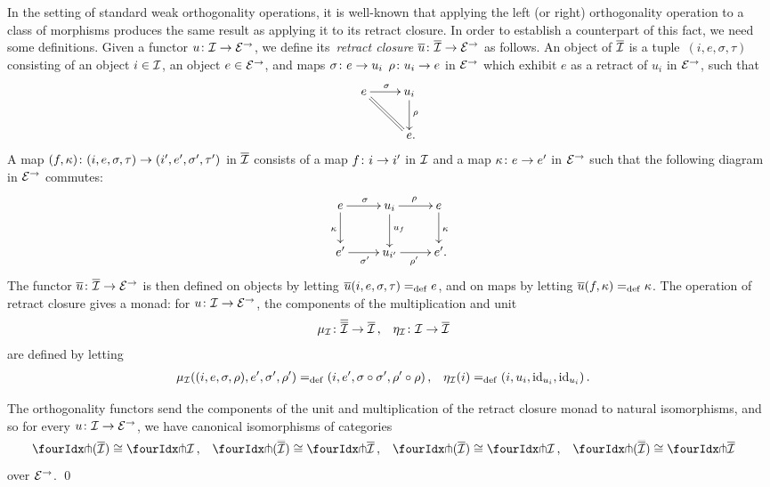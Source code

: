 \documentclass[reqno,10pt,a4paper,oneside,draft]{amsart}
\begin{document}
In the setting of standard weak orthogonality operations, it is well-known that applying the left (or right) orthogonality operation to a class of morphisms produces the same result as applying it to its retract closure.
In order to establish a counterpart of this fact, we need some definitions.
Given a functor $u \co \cal{I} \to \calE^\to$, we define its~\emph{retract closure} $\overline{u} \co \overline{\cal{I}} \to \catE^\to$ as follows.
An object of $\overline{\cal{I}}$ is a tuple~$(i, e, \sigma, \tau)$ consisting of an object $i \in \cal{I}$, an object $e \in \catE^\to$, and maps $\sigma \co e \rightarrow u_i$ $\rho \co u_i \rightarrow e$ in $\catE^\to$ which exhibit $e$ as a retract of $u_i$ in $\catE^\to$, \ie such that
\[
\xymatrix{
  e
  \ar[r]^{\sigma}
  \ar@{=}[dr]
&
  u_i
  \ar[d]^{\rho}
\\&
  e
\rlap{.}}
\]
A map $(f, \kappa) \co (i, e, \sigma, \tau) \to (i', e', \sigma', \tau')$ in $\overline{\cal{I}}$ consists of a map $f \co i \to i'$ in $\cal{I}$ and a map $\kappa \co e \rightarrow e'$ in $\catE^\to$ such that the following diagram in $\catE^\to$ commutes:
\[
\xymatrix{
  e
  \ar[r]^{\sigma}
  \ar[d]_{\kappa}
&
  u_i
  \ar[r]^{\rho}
  \ar[d]^{u_f}
&
  e
  \ar[d]^{\kappa}
\\
  e'
  \ar[r]_{\sigma'}
&
  u_{i'}
  \ar[r]_{\rho'}
&
  e'
\rlap{.}}
\]
The functor $\overline{u} \co \overline{\cal{I}} \to \catE^\to$ is then defined on objects by letting $\overline{u}(i, e, \sigma, \tau) \defeq e$, and on maps by letting $\overline{u}(f, \kappa) \defeq \kappa$.
The operation of retract closure gives a monad: for $u \co \cal{I} \to \catE^\to$, the components of the multiplication and unit
\[
\begin{aligned}
  \mu_\cal{I} &\co \overline{\overline{\cal{I}}} \to \overline{\cal{I}}
\, , &
  \eta_\cal{I} &\co \cal{I} \to \overline{\cal{I}}
\end{aligned}
\]
are defined by letting
\[
\begin{aligned}
  \mu_\cal{I}((i, e, \sigma, \rho), e', \sigma', \rho') &\defeq (i, e', \sigma \cc \sigma', \rho' \cc \rho)
\, , &
  \eta_\cal{I}(i) &\defeq (i, u_i, \id_{u_i}, \id_{u_i})
\, .
\end{aligned}
\]

\begin{proposition} \label{retract-closure}
The orthogonality functors send the components of the unit and multiplication of the retract closure monad to natural isomorphisms, and so for every $u \co \cal{I} \to \catE^\to$, we have canonical isomorphisms of categories
\[
\begin{aligned}
  \liftr{(\overline{\cal{I}})} &\iso \liftr{\cal{I}}
\, ,&
  \liftr{(\overline{\overline{\cal{I}}})} &\iso \liftr{\overline{\cal{I}}}
\, ,&
  \liftl{(\overline{\cal{I}})} &\iso \liftl{\cal{I}}
\, ,&
 \liftl{(\overline{\overline{\cal{I}}})} &\iso \liftl{\overline{\cal{I}}}
\end{aligned}
\]
over $\catE^\to$.
\qed
\end{proposition}
\end{document}
